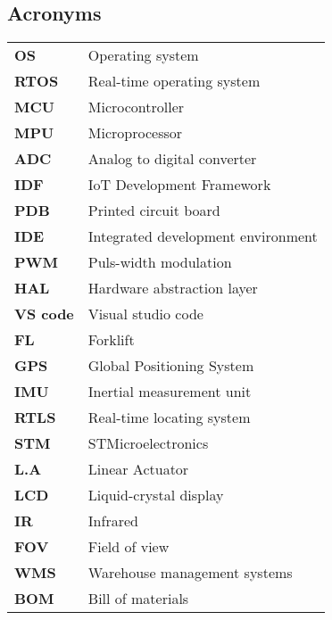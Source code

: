 \documentclass[../report.tex]{subfiles}
\begin{document}
\subsection{Acronyms}
\begin{table}[H]
    \begin{center}
        \begin{tabularx}{\linewidth}{l L}
            \textbf{OS} & Operating system\\
            \textbf{RTOS} & Real-time operating system\\
            \textbf{MCU} & Microcontroller\\
            \textbf{MPU} & Microprocessor \\
            \textbf{ADC} & Analog to digital converter\\
            \textbf{IDF} & IoT Development Framework\\
            \textbf{PDB} & Printed circuit board\\
            \textbf{IDE} & Integrated development environment\\
            \textbf{PWM} & Puls-width modulation \\
            \textbf{HAL} & Hardware abstraction layer\\
            \textbf{VS code} & Visual studio code\\
            \textbf{FL} & Forklift\\
            \textbf{GPS} & Global Positioning System\\
            \textbf{IMU} & Inertial measurement unit\\
            \textbf{RTLS} & Real-time locating system\\
            \textbf{STM} & STMicroelectronics\\
            \textbf{L.A} & Linear Actuator \\
            \textbf{LCD} &Liquid-crystal display \\
            \textbf{IR} & Infrared\\
            \textbf{FOV} & Field of view\\
            \textbf{WMS} & Warehouse management systems\\
            \textbf{BOM} & Bill of materials\\
        \end{tabularx}
    \end{center}
\end{table}
\end{document}

